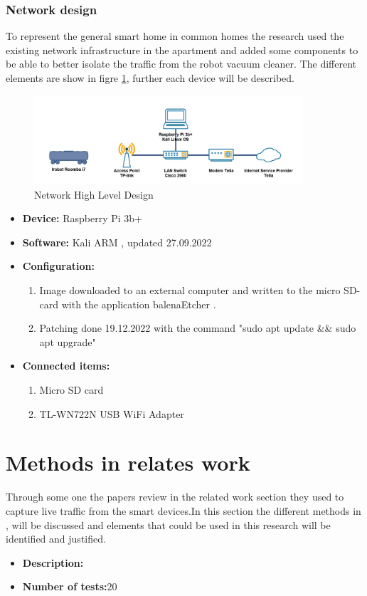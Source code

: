 \subsubsection{Network design}
To represent the general smart home in common homes the research used the existing network infrastructure in the apartment and added some components to be able to better isolate the traffic from the robot vacuum cleaner. The different elements are show in figre \ref{fig:HLD}, further each device will be described. 

\begin{figure}[!ht]
    \centering
    \includegraphics[width=10cm]{figures/HLD.png}
    \caption{Network High Level Design}
    \label{fig:HLD}
\end{figure}

\begin{itemize}
    \item \textbf{Device:} Raspberry Pi 3b+  
    \item \textbf{Software:} Kali ARM \cite{kalidownload}, updated 27.09.2022
    \item \textbf{Configuration:}
    \begin{enumerate}
        \item Image downloaded to an external computer and written to the micro SD-card with the application balenaEtcher \cite{balenaetcherdownload}.
        \item Patching done 19.12.2022 with the command "sudo apt update \&\& sudo apt upgrade"
    \end{enumerate}
    \item \textbf{Connected items:}
    \begin{enumerate}
        \item Micro SD card \cite{microsdcard}
        \item TL-WN722N USB WiFi Adapter \cite{tp-link}
    \end{enumerate}
\end{itemize}





\section{Methods in relates work}
Through some one the papers review in the related work section they used to capture live traffic from the smart devices.In this section the different methods in \cite{lindaeavesdropping} \cite{eavsIoT} \cite{Neato}, will be discussed and elements that could be used in this research will be identified and justified. 


\begin{itemize}
    \item \textbf{Description:}
    \item \textbf{Number of tests:}20
\end{itemize}